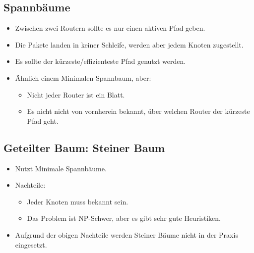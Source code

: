         \subsection{Spannbäume}
            \begin{itemize}
            	\item Zwischen zwei Routern sollte es nur einen aktiven Pfad geben.
            	\item Die Pakete landen in keiner Schleife, werden aber jedem Knoten zugestellt.
            	\item Es sollte der kürzeste/effizienteste Pfad genutzt werden.
            	\item Ähnlich einem Minimalen Spannbaum, aber:
                	\begin{itemize}
                		\item Nicht jeder Router ist ein Blatt.
                		\item Es nicht nicht von vornherein bekannt, über welchen Router der kürzeste Pfad geht.
                	\end{itemize}
            \end{itemize}

        \subsection{Geteilter Baum: Steiner Baum}
            \begin{itemize}
            	\item Nutzt Minimale Spannbäume.
            	\item Nachteile:
                	\begin{itemize}
                		\item Jeder Knoten muss bekannt sein.
                		\item Das Problem ist NP-Schwer, aber es gibt sehr gute Heuristiken.
                	\end{itemize}
            	\item Aufgrund der obigen Nachteile werden Steiner Bäume nicht in der Praxis eingesetzt.
            \end{itemize}

